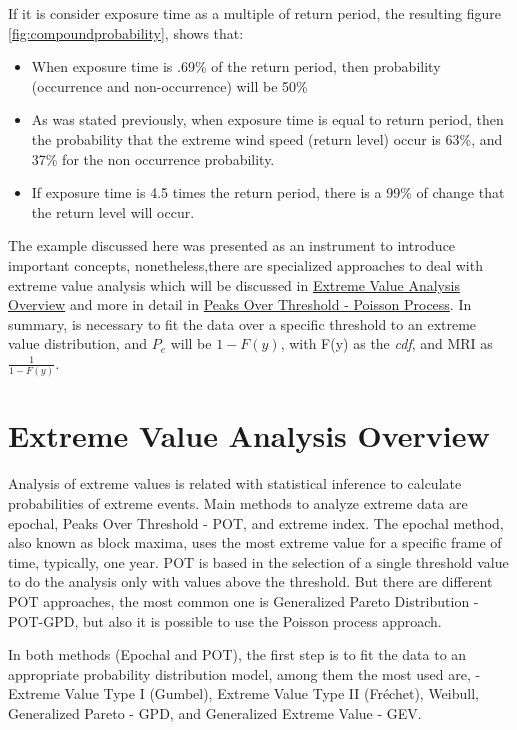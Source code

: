 \documentclass[12pt,oneside]{reedthesis}
\providecommand{\tightlist}{%
  \setlength{\itemsep}{0pt}\setlength{\parskip}{0pt}}
\begin{document}
If it is consider exposure time as a multiple of return period, the resulting figure \ref{fig:compoundprobability}, shows that:
\begin{itemize}
\tightlist
\item
  When exposure time is .69\% of the return period, then probability (occurrence and non-occurrence) will be 50\%
\item
  As was stated previously, when exposure time is equal to return period, then the probability that the extreme wind speed (return level) occur is 63\%, and 37\% for the non occurrence probability.
\item
  If exposure time is 4.5 times the return period, there is a 99\% of change that the return level will occur.
\end{itemize}
The example discussed here was presented as an instrument to introduce important concepts, nonetheless,there are specialized approaches to deal with extreme value analysis which will be discussed in \protect\hyperlink{extremeoverview}{Extreme Value Analysis Overview} and more in detail in \protect\hyperlink{pot-pp}{Peaks Over Threshold - Poisson Process}. In summary, is necessary to fit the data over a specific threshold to an extreme value distribution, and \(P_e\) will be \(1-F(y)\), with F(y) as the \emph{cdf}, and MRI as \(\frac{1}{1-F(y)}\).

\hypertarget{extremeoverview}{%
\section{Extreme Value Analysis Overview}\label{extremeoverview}}

Analysis of extreme values is related with statistical inference to calculate probabilities of extreme events. Main methods to analyze extreme data are epochal, Peaks Over Threshold - POT, and extreme index. The epochal method, also known as block maxima, uses the most extreme value for a specific frame of time, typically, one year. POT is based in the selection of a single threshold value to do the analysis only with values above the threshold. But there are different POT approaches, the most common one is Generalized Pareto Distribution - POT-GPD, but also it is possible to use the Poisson process approach.

In both methods (Epochal and POT), the first step is to fit the data to an appropriate probability distribution model, among them the most used are, - Extreme Value Type I (Gumbel), Extreme Value Type II (Fréchet), Weibull, Generalized Pareto - GPD, and Generalized Extreme Value - GEV.
\end{document}
